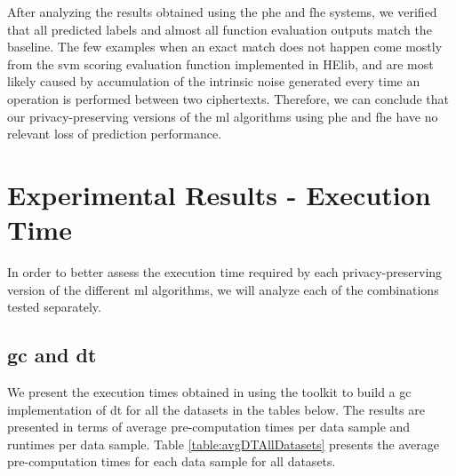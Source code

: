 After analyzing the results obtained using the \ac{phe} and \ac{fhe} systems, we verified that all predicted labels and almost all function evaluation outputs match the baseline. The few examples when an exact match does not happen come mostly from the \ac{svm} scoring evaluation function implemented in HElib, and are most likely caused by accumulation of the intrinsic noise generated every time an operation is performed between two ciphertexts. Therefore, we can conclude that our privacy-preserving versions of the \ac{ml} algorithms using \ac{phe} and \ac{fhe} have no relevant loss of prediction performance.

\section{Experimental Results - Execution Time}
\label{sec:ExperimentalResultsExecutionTime}

In order to better assess the execution time required by each privacy-preserving version of the different \ac{ml} algorithms, we will analyze each of the combinations tested separately.



\subsection{\acl{gc} and \acl{dt}}

We present the execution times obtained in using the toolkit to build a \ac{gc} implementation of \ac{dt} for all the datasets in the tables below. The results are presented in terms of average pre-computation times per data sample and runtimes per data sample. Table \ref{table:avgDTAllDatasets} presents the average pre-computation times for each data sample for all datasets.


